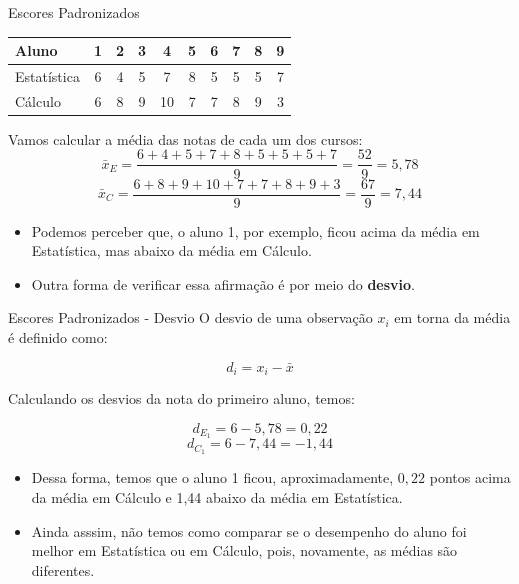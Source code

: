 \begin{frame}{Escores Padronizados}
    \centering
    \begin{tabular}{lccccccccc}
    \toprule
    Aluno & 1 & 2 & 3 & 4 & 5 & 6 & 7 & 8 & 9 \\
    \midrule
    Estatística & 6 & 4 & 5 & 7 & 8 & 5 & 5 & 5 & 7 \\
    Cálculo     & 6 & 8 & 9 & 10 & 7 & 7 & 8 & 9 & 3 \\
    \bottomrule
    \end{tabular}

    Vamos calcular a média das notas de cada um dos cursos:
    $$\bar{x}_{E} = \dfrac{6 + 4 + 5 + 7 + 8 + 5 + 5 + 5 + 7}{9} = \dfrac{52}{9} = 5,78$$
    \pause
    $$\bar{x}_{C} = \dfrac{6 + 8 + 9 + 10 + 7 + 7 + 8 + 9 + 3}{9} = \dfrac{67}{9} = 7,44$$

    \pause
    \begin{itemize}
        \item Podemos perceber que, o aluno 1, por exemplo, ficou acima da média em Estatística, mas abaixo da média em Cálculo.
        \pause
        \item Outra forma de verificar essa afirmação é por meio do \textbf{desvio}.
    \end{itemize}
\end{frame}

\begin{frame}{Escores Padronizados - Desvio}
    O desvio de uma observação $x_i$ em torna da média é definido como:

    $$d_i = x_i - \bar{x}$$

    \pause

    Calculando os desvios da nota do primeiro aluno, temos:

    $$d_{E_1} = 6 - 5,78 = 0,22$$
    $$d_{C_1} = 6 - 7,44 = -1,44$$

    \pause

    \begin{itemize}
        \item Dessa forma, temos que o aluno 1 ficou, aproximadamente, $0,22$ pontos acima da média em Cálculo e 1,44 abaixo da média em Estatística.  
        \pause
        \item Ainda asssim, não temos como comparar se o desempenho do aluno foi melhor em Estatística ou em Cálculo, pois, novamente, as médias são diferentes. 
    \end{itemize}
\end{frame}

